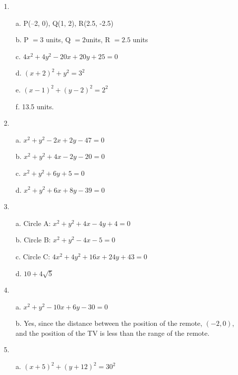 \begin{enumerate}[leftmargin=*, widest=19]
\item[1.]
\begin{enumerate}
  \item[a.] P(--2, 0), Q(1, 2), R(2.5, -2.5)
  \item[b.] P $= 3$ units, Q $= 2$units, R $= 2.5$ units
  \item[c.] $4x^2 + 4y^2 - 20x + 20y + 25 = 0$
  \item[d.] $(x + 2)^2 + y^2 = 3^2$
  \item[e.] $(x - 1)^2 + (y - 2)^2 = 2^2$
  \item[f.] 13.5 units.
\end{enumerate}
\item[2.]
\begin{enumerate}
  \item[a.] $x^2 + y^2 - 2x + 2y - 47 = 0$
  \item[b.] $x^2 + y^2 + 4x - 2y - 20 = 0$
  \item[c.] $x^2 + y^2 + 6y + 5 = 0$
  \item[d.] $x^2 + y^2 + 6x + 8y - 39 = 0$
\end{enumerate}
\item[3.]
\begin{enumerate}
  \item[a.] Circle A: $x^2 + y^2 + 4x - 4y + 4 = 0$
  \item[b.] Circle B: $x^2 + y^2 - 4x - 5 = 0$
  \item[c.] Circle C: $4x^2 + 4y^2 + 16x + 24y + 43 = 0$
  \item[d.] $10 + 4\sqrt{5}$
\end{enumerate}
\item[4.]
\begin{enumerate}
  \item[a.] $x^2 + y^2 - 10x + 6y - 30 = 0$
  \item[b.] Yes, since the distance between the position of the remote, $(-2, 0)$,
  and the position of the TV is less than the range of the remote.
\end{enumerate}
\item[5.]
\begin{enumerate}
  \item[a.] $(x + 5)^2 + (y + 12)^2 = 30^2$

\end{enumerate}
\end{enumerate}
